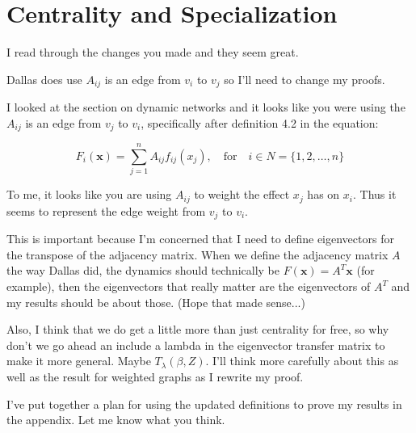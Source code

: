 \documentclass{paper}
\begin{document}
\section*{Centrality and Specialization}

I read through the changes you made and they seem great. 

Dallas does use $A_{ij}$ is an edge from $v_i$ to $v_j$ so I'll need to change my proofs. 

I looked at the section on dynamic networks and it looks like you were using the $A_{ij}$ is an edge from $v_j$ to $v_i$, specifically after definition 4.2 in the equation:

\begin{equation}\label{eq:netclass}
F_i(\mathbf{x})=\sum_{j=1}^n A_{ij}f_{ij}(x_j), \quad \text{for} \quad i\in N=\{1,2,\dots,n\}
\end{equation}

To me, it looks like you are using $A_{ij}$ to weight the effect $x_j$ has on $x_i$. Thus it seems to represent the edge weight from $v_j$ to $v_i$.

This is important because I'm concerned that I need to define eigenvectors for the transpose of the adjacency matrix. When we define the adjacency  matrix $A$ the way Dallas did, the dynamics should technically be $F(\mathbf{x})= A^{T} \mathbf{x}$ (for example), then the eigenvectors that really matter are the eigenvectors of $A^{T}$ and my results should be about those. (Hope that made sense...)


Also, I think that we do get a little more than just centrality for free, so why don't we go ahead an include a lambda in the eigenvector transfer matrix to make it more general. Maybe $T_\lambda(\beta,Z)$. I'll think more carefully about this as well as the result for weighted graphs as I rewrite my proof.

I've put together a plan for using the updated definitions to prove my results in the appendix. Let me know what you think.
\end{document}
